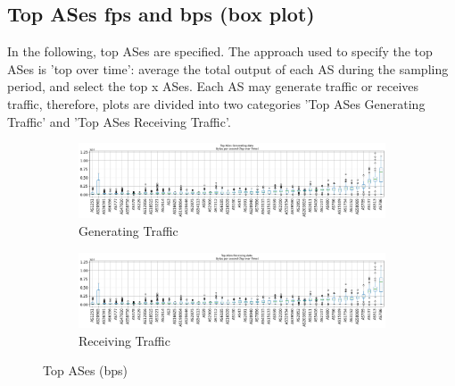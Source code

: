 \documentclass[10pt, journal, letterpaper]{IEEEtran}
\newcommand\boxFigSze{1}
\begin{document}
\subsection{Top ASes fps and bps (box plot)}
In the following, top ASes are specified. The approach used to specify the top ASes is 'top over time': average the total output of each AS during the sampling period, and select the top x ASes.
Each AS may generate traffic or receives traffic, therefore, plots are divided into two categories 'Top ASes Generating Traffic' and 'Top ASes Receiving Traffic'.
\begin{figure}
    \begin{subfigure}{\boxFigSze\textwidth}
          \centering
          \includegraphics[width=\columnwidth]{img/top_AS_generating_bps.png}
          \caption{Generating Traffic}
          \label{fig:top_generating_bps}
    \end{subfigure}
    \begin{subfigure}{\boxFigSze\textwidth}
          \centering
          \includegraphics[width=\columnwidth]{img/top_AS_receiving_bps.png}
          \caption{Receiving Traffic}
          \label{fig:top_receiving_bps}
    \end{subfigure}
    \caption{Top ASes (bps)}
    \label{fig:top_AS_bps}
\end{figure}
\end{document}
